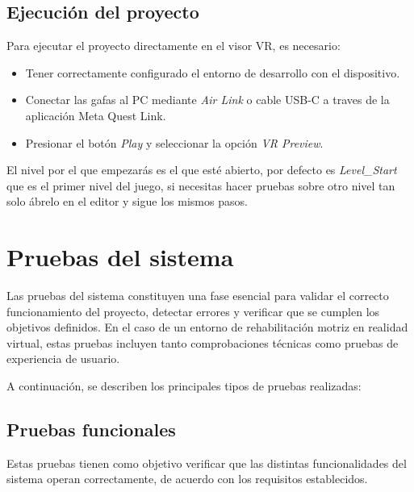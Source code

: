 \subsection{Ejecución del proyecto}

Para ejecutar el proyecto directamente en el visor VR, es necesario:
    \begin{itemize}
        \item Tener correctamente configurado el entorno de desarrollo con el dispositivo.
        \item Conectar las gafas al PC mediante \textit{Air Link} o cable USB-C a traves de la aplicación Meta Quest Link.
        \item Presionar el botón \textit{Play} y seleccionar la opción \textit{VR Preview}.
    \end{itemize}

El nivel por el que empezarás es el que esté abierto, por defecto es \textit{Level\_Start} que es el primer nivel del juego, si necesitas hacer pruebas sobre otro nivel tan solo ábrelo en el editor y sigue los mismos pasos. 


\section{Pruebas del sistema}

Las pruebas del sistema constituyen una fase esencial para validar el correcto funcionamiento del proyecto, detectar errores y verificar que se cumplen los objetivos definidos. En el caso de un entorno de rehabilitación motriz en realidad virtual, estas pruebas incluyen tanto comprobaciones técnicas como pruebas de experiencia de usuario.

A continuación, se describen los principales tipos de pruebas realizadas:

\subsection{Pruebas funcionales}

Estas pruebas tienen como objetivo verificar que las distintas funcionalidades del sistema operan correctamente, de acuerdo con los requisitos establecidos.

